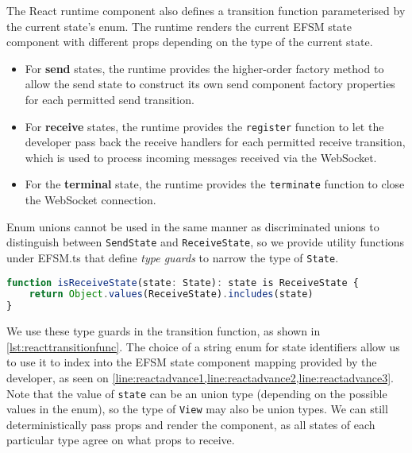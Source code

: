 The React runtime component also defines a transition function
parameterised by the current state's enum. The runtime renders
the current EFSM state component with different props depending
on the type of the current state.

\begin{itemize}
\item
For \textbf{send} states, the runtime provides the higher-order factory
method to allow the send state to construct its own send component
factory properties for each permitted send transition.

\item
For \textbf{receive} states, the runtime provides the \texttt{register}
function to let the developer pass back the receive handlers
for each permitted receive transition, which is used
to process incoming messages received via the WebSocket.

\item
For the \textbf{terminal} state, the runtime provides the
\texttt{terminate} function to close the WebSocket connection.
\end{itemize}

Enum unions cannot be used in the same manner as discriminated unions
to distinguish between \texttt{SendState} and \texttt{ReceiveState},
so we provide utility functions under EFSM.ts that define
\textit{type guards} to narrow the type of \texttt{State}.

\begin{lstlisting}[language=javascript,numbers=none]
function isReceiveState(state: State): state is ReceiveState {
	return Object.values(ReceiveState).includes(state)
}
\end{lstlisting}

We use these type guards in the transition function,
as shown in \cref{lst:reacttransitionfunc}.
The choice of a string enum for state identifiers
allow us to use it to index into the EFSM state component mapping
provided by the developer, as seen on 
\cref{line:reactadvance1,line:reactadvance2,line:reactadvance3}.
Note that the value of \texttt{state} can be an union type
(depending on the possible values in the enum),
so the type of \texttt{View} may also be union types.
We can still deterministically pass props and render the component,
as all states of each particular type agree on what props to receive.

